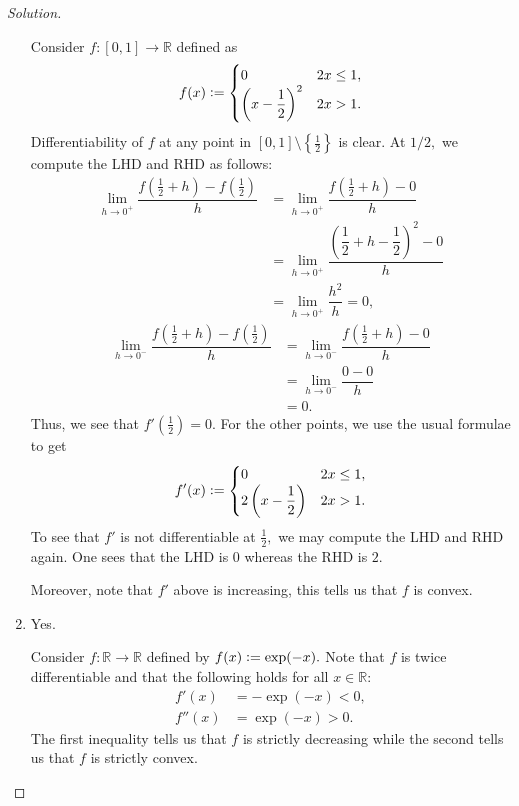\documentclass[12pt]{article}
\theoremstyle{definition}
\newenvironment{soln}{\begin{proof}[Solution]}{\end{proof}}
\begin{document}
\begin{soln}
\begin{enumerate}[leftmargin=*]
		Consider $f:[0, 1] \to \mathbb{R}$ defined as
		\begin{equation*} 
			f(x) \vcentcolon= \begin{cases}
				0 & 2x \le 1,\\
				\left(x - \dfrac{1}{2}\right)^2 & 2x > 1.
			\end{cases}
		\end{equation*}
		Differentiability of $f$ at any point in $[0, 1]\setminus\left\{\frac{1}{2}\right\}$ is clear. At $1/2,$ we compute the LHD and RHD as follows:
		\begin{align*} 
			\lim_{h\to 0^+}\dfrac{f\left(\frac{1}{2} + h\right) - f\left(\frac{1}{2}\right)}{h} &= \lim_{h\to 0^+}\dfrac{f\left(\frac{1}{2} + h\right) - 0}{h}\\
			&= \lim_{h\to 0^+}\dfrac{\left(\dfrac{1}{2} + h - \dfrac{1}{2}\right)^2 - 0}{h}\\
			&= \lim_{h\to 0^+}\dfrac{h^2}{h} = 0,
		\end{align*}
		\begin{align*} 
			\lim_{h\to 0^-}\dfrac{f\left(\frac{1}{2} + h\right) - f\left(\frac{1}{2}\right)}{h} &= \lim_{h\to 0^-}\dfrac{f\left(\frac{1}{2} + h\right) - 0}{h}\\
			&= \lim_{h\to 0^-}\dfrac{0 - 0}{h}\\
			&= 0.
		\end{align*}
		Thus, we see that $f'\left(\frac{1}{2}\right) = 0.$ For the other points, we use the usual formulae to get
		\begin{equation*} 
			f'(x) \vcentcolon= \begin{cases}
				0 & 2x \le 1,\\
				2\left(x - \dfrac{1}{2}\right) & 2x > 1.
			\end{cases}
		\end{equation*}
		To see that $f'$ is not differentiable at $\frac{1}{2},$ we may compute the LHD and RHD again. One sees that the LHD is $0$ whereas the RHD is $2.$

		Moreover, note that $f'$ above is increasing, this tells us that $f$ is convex.
		\item {\color{blue}Yes}.

		Consider $f:\mathbb{R}\to\mathbb{R}$ defined by $f(x) \vcentcolon= \exp(-x).$ Note that $f$ is twice differentiable and that the following holds for all $x \in \mathbb{R}:$
		\begin{align*} 
			f'(x) &= -\exp(-x) < 0,\\
			f''(x) &= \exp(-x) > 0.
		\end{align*}
		The first inequality tells us that $f$ is strictly decreasing while the second tells us that $f$ is strictly convex. \qedhere
	\end{enumerate}
\end{soln}
\newpage
\end{document}

